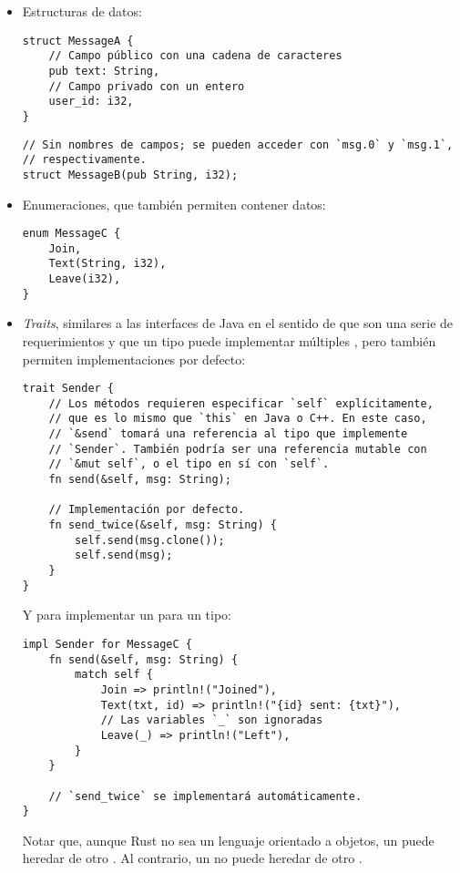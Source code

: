 \begin{itemize}
    \item Estructuras de datos:

\begin{verbatim}
struct MessageA {
    // Campo público con una cadena de caracteres
    pub text: String,
    // Campo privado con un entero
    user_id: i32,
}
\end{verbatim}

\begin{verbatim}
// Sin nombres de campos; se pueden acceder con `msg.0` y `msg.1`,
// respectivamente.
struct MessageB(pub String, i32);
\end{verbatim}

    \item Enumeraciones, que también permiten contener datos:

\begin{verbatim}
enum MessageC {
    Join,
    Text(String, i32),
    Leave(i32),
}
\end{verbatim}

    \item \emph{Traits}, similares a las interfaces de Java en el sentido de que
        son una serie de requerimientos y que un tipo puede implementar
        múltiples \traits, pero también permiten implementaciones por defecto:

\begin{verbatim}
trait Sender {
    // Los métodos requieren especificar `self` explícitamente,
    // que es lo mismo que `this` en Java o C++. En este caso,
    // `&send` tomará una referencia al tipo que implemente
    // `Sender`. También podría ser una referencia mutable con
    // `&mut self`, o el tipo en sí con `self`.
    fn send(&self, msg: String);

    // Implementación por defecto.
    fn send_twice(&self, msg: String) {
        self.send(msg.clone());
        self.send(msg);
    }
}
\end{verbatim}

Y para implementar un \trait para un tipo:

\begin{verbatim}
impl Sender for MessageC {
    fn send(&self, msg: String) {
        match self {
            Join => println!("Joined"),
            Text(txt, id) => println!("{id} sent: {txt}"),
            // Las variables `_` son ignoradas
            Leave(_) => println!("Left"),
        }
    }

    // `send_twice` se implementará automáticamente.
}
\end{verbatim}

    Notar que, aunque Rust no sea un lenguaje orientado a objetos, un
    \trait puede heredar de otro \trait. Al contrario, un \struct no puede
    heredar de otro \struct.

\end{itemize}

